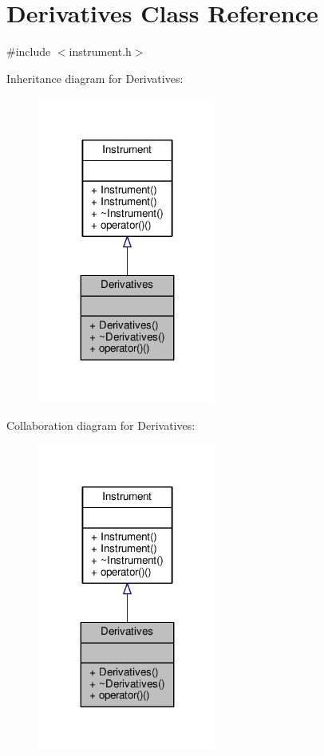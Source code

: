 \hypertarget{classDerivatives}{}\section{Derivatives Class Reference}
\label{classDerivatives}


{\ttfamily \#include $<$instrument.\+h$>$}



Inheritance diagram for Derivatives\+:
\nopagebreak
\begin{figure}[H]
\begin{center}
\leavevmode
\includegraphics[width=167pt]{classDerivatives__inherit__graph}
\end{center}
\end{figure}


Collaboration diagram for Derivatives\+:
\nopagebreak
\begin{figure}[H]
\begin{center}
\leavevmode
\includegraphics[width=167pt]{classDerivatives__coll__graph}
\end{center}
\end{figure}
